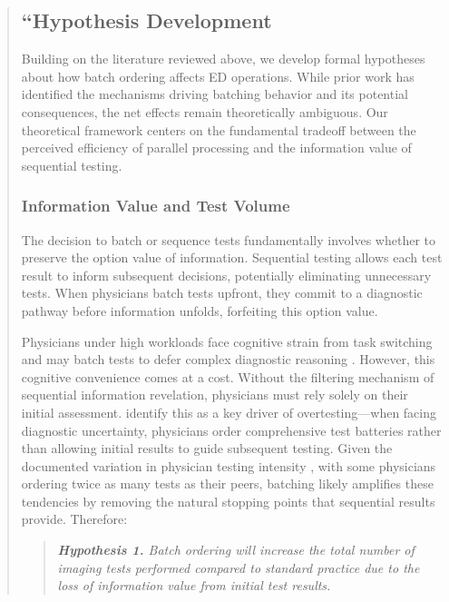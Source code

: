 \documentclass[11pt]{article}
\newcommand{\1}{\hbox{\rm 1\kern-.35em 1}}
\begin{document}
\begin{quote}
\subsection*{``Hypothesis Development}

Building on the literature reviewed above, we develop formal hypotheses about how batch ordering affects ED operations. While prior work has identified the mechanisms driving batching behavior and its potential consequences, the net effects remain theoretically ambiguous. Our theoretical framework centers on the fundamental tradeoff between the perceived efficiency of parallel processing and the information value of sequential testing.

\subsubsection*{Information Value and Test Volume}

The decision to batch or sequence tests fundamentally involves whether to preserve the option value of information. Sequential testing allows each test result to inform subsequent decisions, potentially eliminating unnecessary tests. When physicians batch tests upfront, they commit to a diagnostic pathway before information unfolds, forfeiting this option value.

Physicians under high workloads face cognitive strain from task switching and may batch tests to defer complex diagnostic reasoning \cite{kc2013does, skaugset2016can}. However, this cognitive convenience comes at a cost. Without the filtering mechanism of sequential information revelation, physicians must rely solely on their initial assessment. \cite{lam2020why} identify this as a key driver of overtesting---when facing diagnostic uncertainty, physicians order comprehensive test batteries rather than allowing initial results to guide subsequent testing. Given the documented variation in physician testing intensity \cite{hodgson2018are}, with some physicians ordering twice as many tests as their peers, batching likely amplifies these tendencies by removing the natural stopping points that sequential results provide. Therefore:

\begin{quote}
\small
\textit{\textbf{Hypothesis 1.} Batch ordering will increase the total number of imaging tests performed compared to standard practice due to the loss of information value from initial test results.}
\end{quote}


\end{quote}
\end{document}
